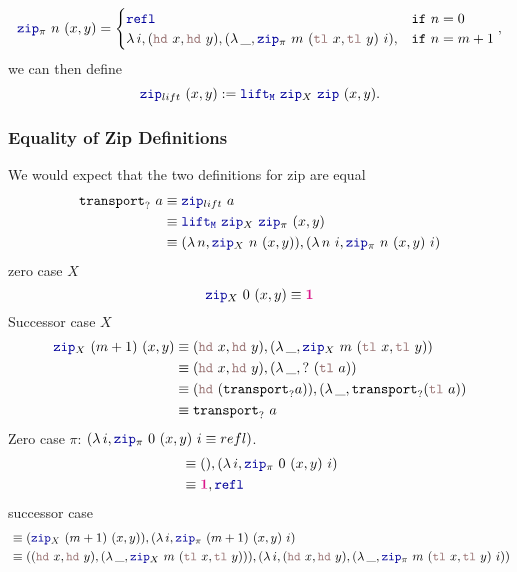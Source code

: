 \documentclass[twoside,11pt,openright]{report}
\theoremstyle{plain} %
\theoremstyle{definition}
\theoremstyle{remark}
\newcommand*{\type}[1]{\textcolor{magenta!90!black}{#1}}
\newcommand*{\unit}{\type{\textbf{1}}}
\newcommand*{\function}[1]{\textcolor{blue!60!black}{\ensuremath{\mathtt{#1}}}}
\newcommand*{\destructor}[1]{\textcolor{pink!60!black}{\ensuremath{\mathtt{#1}}}}
\begin{document}
\begin{equation}
  \function{zip}_{\pi}~n~(x , y) = \begin{cases} \function{refl} & \mathtt{if}~n = 0 \\ \lambda\,i,(\destructor{hd}~x , \destructor{hd}~y) , (\lambda\,\_, \function{zip}_{\pi}~m~(\destructor{tl}~x,\destructor{tl}~y)~i) , & \mathtt{if}~n = m + 1 \end{cases},
\end{equation}
we can then define
\begin{equation}
  \function{zip}_{lift}~(x , y) := \function{lift_M}~\function{zip}_X~\function{zip}~(x,y).
\end{equation}
\subsubsection{Equality of Zip Definitions}
We would expect that the two definitions for zip are equal
\begin{align}
  \texttt{transport}_{?}~a &\equiv \function{zip}_{lift}~a \\
                           &\equiv \function{lift_M}~\function{zip}_X~\function{zip}_\pi~(x,y) \\
                           &\equiv (\lambda\,n, \function{zip}_X~n~(x,y)) , (\lambda\,n~i, \function{zip}_\pi~n~(x,y)~i)
\end{align}
zero case \(X\)
\begin{equation}
  \function{zip}_X~0~(x,y) \equiv \unit
\end{equation}
Successor case \(X\)
\begin{align} 
  \function{zip}_X~(m+1)~(x,y) &\equiv (\destructor{hd}~x, \destructor{hd}~y),(\lambda\,\_,\function{zip}_X~m~(\destructor{tl}~x,\destructor{tl}~y)) \\
                               &\equiv (\destructor{hd}~x, \destructor{hd}~y),(\lambda\,\_, {?}~(\destructor{tl}~a)) \\
                               &\equiv (\destructor{hd}~(\texttt{transport}_{?} a)),(\lambda\,\_, \texttt{transport}_{?} (\destructor{tl}~a)) \\
                               &\equiv \mathtt{transport}_?~a \\
\end{align}
Zero case \(\pi\): \((\lambda\,i, \function{zip}_\pi~0~(x,y)~i \equiv refl)\).
\begin{align}
  &\equiv () , (\lambda\,i, \function{zip}_\pi~0~(x,y)~i) \\
  &\equiv \unit , \function{refl} \\
\end{align}
successor case
\begin{align}
  &\equiv (\function{zip}_X~(m+1)~(x,y)) , (\lambda\,i, \function{zip}_\pi~(m+1)~(x,y)~i) \\
  &\equiv ((\destructor{hd}~x, \destructor{hd}~y),(\lambda\,\_,\function{zip}_X~m~(\destructor{tl}~x,\destructor{tl}~y))) , (\lambda\,i, (\destructor{hd}~x, \destructor{hd}~y),(\lambda\,\_,\function{zip}_\pi~m~(\destructor{tl}~x,\destructor{tl}~y)~i))
\end{align}
\end{document}
